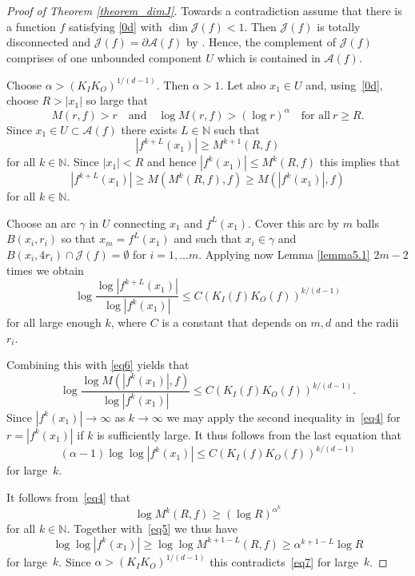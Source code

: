 \documentclass[12pt,a4paper]{amsart}
\theoremstyle{plain}
\theoremstyle{definition}
\theoremstyle{remark}
\def\N{\mathbb N}
\def\cA{\mathcal A}
\numberwithin{equation}{section}
\begin{document}
\begin{proof}[Proof of Theorem \ref{theorem_dimJ}]
Towards a contradiction assume that there is a function $f$ satisfying \eqref{0d}
with $\dim\mathcal{J}(f)<1$. Then $\mathcal{J}(f)$ is totally disconnected and
$\mathcal{J}(f)=\partial\mathcal{A}(f)$  by \cite[Theorem 1.2]{BFN}.
Hence, the complement of $\mathcal{J}(f)$ comprises of one unbounded component $U$ 
which is contained in $\cA(f)$.
	
Choose $\alpha>(K_IK_O)^{1/(d-1)}$. Then $\alpha> 1$. Let also $x_1\in U$
and, using~\eqref{0d},
choose $R>|x_1|$  so large that
\begin{equation}\label{eq4}
M(r,f)>r
\quad\text{and}\quad
\log M(r,f)>(\log r)^\alpha \quad \text{for all}\ r\geq R.
\end{equation}
Since $x_1\in U\subset \cA(f)$ there exists $L\in\mathbb{N}$ such that 
\begin{equation}\label{eq5}
\left|f^{k+L}(x_1)\right|\geq M^{k+1}(R,f)
\end{equation}
for all $k\in\N$.
Since $|x_1|<R$ and hence $|f^k(x_1)|\leq M^{k}(R,f)$ this implies that 
\begin{equation}\label{eq6}
\left|f^{k+L}(x_1)\right|\geq M\!\left(M^{k}(R,f),f\right)\geq M\!\left(|f^k(x_1)|,f\right)
\end{equation}
for all $k\in\N$.
	
Choose an arc $\gamma$ in $U$ connecting $x_1$ and $f^{L}(x_1)$. 
Cover this arc by $m$ balls $B(x_i,r_i)$ so that $x_m=f^{L}(x_1)$ 
and such that $x_i\in\gamma$ and $B(x_i,4r_i)\cap \mathcal{J}(f)=\emptyset$ for
$i=1,\dots m$.
Applying now Lemma \ref{lemma5.1} $2m-2$ times we obtain 
\begin{equation}\label{eq1}
\log\frac{\log|f^{k+L}(x_1)|}{\log|f^k(x_1)|}\leq C\left(K_I(f)K_O(f)\right)^{k/(d-1)}
\end{equation} 
for all large enough $k$,
where $C$ is a constant that depends on $m, d$ and the radii $r_i$. 
	
Combining this with \eqref{eq6} yields that
\[
\log\frac{\log M(|f^k(x_1)|,f)}{\log|f^k(x_1)|}\leq C\left(K_I(f)K_O(f)\right)^{k/(d-1)}.
\]
Since $|f^k(x_1)|\to\infty$ as $k\to \infty$ we may apply the second inequality
in~\eqref{eq4} for 
$r=|f^k(x_1)|$ if $k$ is sufficiently large. 
It thus follows from the last equation that
\begin{equation}\label{eq7}
(\alpha-1)\log\log|f^k(x_1)|\leq C\left(K_I(f)K_O(f)\right)^{k/(d-1)}
\end{equation} 
for large~$k$.

It follows from~\eqref{eq4} that
\[
\log M^{k}(R,f)\geq \left(\log R\right)^{\alpha^{k}}
\]
for all $k\in\N$.
Together with~\eqref{eq5} we thus have 
\[
\log\log|f^k(x_1)|\geq \log \log M^{k+1-L}(R,f)\geq \alpha^{k+1-L}\log R
\]
for large~$k$.
Since
$\alpha>(K_IK_O)^{1/(d-1)}$ this contradicts~\eqref{eq7} for large~$k$.
\end{proof}
\end{document}
